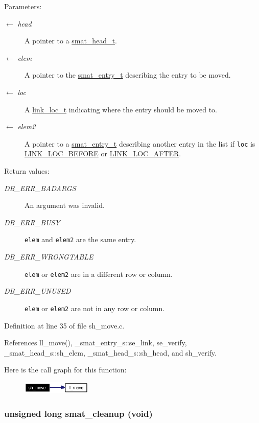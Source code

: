 \begin{Desc}
\item[Parameters:]
\begin{description}
\item[\mbox{$\leftarrow$} {\em head}]A pointer to a \hyperlink{group__dbprim__smat_ga1}{smat\_\-head\_\-t}. \item[\mbox{$\leftarrow$} {\em elem}]A pointer to the \hyperlink{group__dbprim__smat_ga2}{smat\_\-entry\_\-t} describing the entry to be moved. \item[\mbox{$\leftarrow$} {\em loc}]A \hyperlink{group__dbprim__link_ga4}{link\_\-loc\_\-t} indicating where the entry should be moved to. \item[\mbox{$\leftarrow$} {\em elem2}]A pointer to a \hyperlink{group__dbprim__smat_ga2}{smat\_\-entry\_\-t} describing another entry in the list if {\tt loc} is \hyperlink{group__dbprim__link_gga28a135}{LINK\_\-LOC\_\-BEFORE} or \hyperlink{group__dbprim__link_gga28a136}{LINK\_\-LOC\_\-AFTER}.\end{description}
\end{Desc}
\begin{Desc}
\item[Return values:]
\begin{description}
\item[{\em DB\_\-ERR\_\-BADARGS}]An argument was invalid. \item[{\em DB\_\-ERR\_\-BUSY}]{\tt elem} and {\tt elem2} are the same entry. \item[{\em DB\_\-ERR\_\-WRONGTABLE}]{\tt elem} or {\tt elem2} are in a different row or column. \item[{\em DB\_\-ERR\_\-UNUSED}]{\tt elem} or {\tt elem2} are not in any row or column.\end{description}
\end{Desc}


Definition at line 35 of file sh\_\-move.c.

References ll\_\-move(), \_\-smat\_\-entry\_\-s::se\_\-link, se\_\-verify, \_\-smat\_\-head\_\-s::sh\_\-elem, \_\-smat\_\-head\_\-s::sh\_\-head, and sh\_\-verify.

Here is the call graph for this function:\begin{figure}[H]
\begin{center}
\leavevmode
\includegraphics[width=94pt]{group__dbprim__smat_ga19_cgraph}
\end{center}
\end{figure}
\hypertarget{group__dbprim__smat_ga8}{
\subsubsection[smat\_\-cleanup]{\setlength{\rightskip}{0pt plus 5cm}unsigned long smat\_\-cleanup (void)}}
\label{group__dbprim__smat_ga8}


